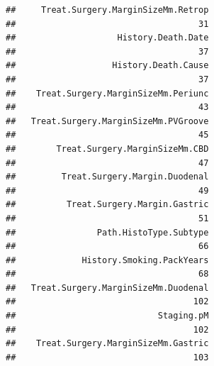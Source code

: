 \documentclass{article}
\begin{document}
\begin{knitrout}
\begin{kframe}
\begin{verbatim}
##     Treat.Surgery.MarginSizeMm.Retrop 
##                                    31 
##                    History.Death.Date 
##                                    37 
##                   History.Death.Cause 
##                                    37 
##    Treat.Surgery.MarginSizeMm.Periunc 
##                                    43 
##   Treat.Surgery.MarginSizeMm.PVGroove 
##                                    45 
##        Treat.Surgery.MarginSizeMm.CBD 
##                                    47 
##         Treat.Surgery.Margin.Duodenal 
##                                    49 
##          Treat.Surgery.Margin.Gastric 
##                                    51 
##                Path.HistoType.Subtype 
##                                    66 
##             History.Smoking.PackYears 
##                                    68 
##   Treat.Surgery.MarginSizeMm.Duodenal 
##                                   102 
##                            Staging.pM 
##                                   102 
##    Treat.Surgery.MarginSizeMm.Gastric 
##                                   103
\end{verbatim}
\end{kframe}
\end{knitrout}


\end{document}

